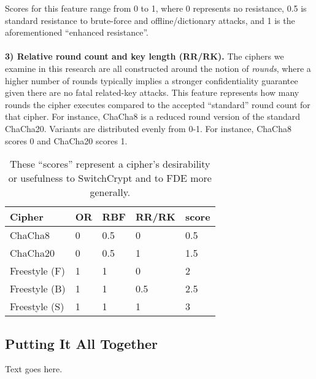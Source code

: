 Scores for this feature range from 0 to 1, where 0 represents no resistance, 0.5
is standard resistance to brute-force and offline/dictionary attacks, and 1 is
the aforementioned ``enhanced resistance''.\\
\\
\textbf{3) Relative round count and key length (RR/RK).} The ciphers we examine
in this research are all constructed around the notion of \emph{rounds}, where a
higher number of rounds typically implies a stronger confidentiality guarantee
given there are no fatal related-key attacks. This feature represents how many
rounds the cipher executes compared to the accepted ``standard'' round count for
that cipher. For instance, ChaCha8 is a reduced round version of the standard
ChaCha20. Variants are distributed evenly from 0-1. For instance, ChaCha8 scores
0 and ChaCha20 scores 1\@.

\begin{table}[]
  \begin{tabular}{@{}lllll@{}}
  \toprule
  \textbf{Cipher} & \textbf{OR} & \textbf{RBF} & \textbf{RR/RK} & \textbf{score} \\ \midrule
  ChaCha8         & 0           & 0.5          & 0              & 0.5            \\
  ChaCha20        & 0           & 0.5          & 1              & 1.5            \\
  Freestyle (F)   & 1           & 1            & 0              & 2              \\
  Freestyle (B)   & 1           & 1            & 0.5            & 2.5            \\
  Freestyle (S)   & 1           & 1            & 1              & 3
  \end{tabular}
  \caption{These ``scores'' represent a cipher's desirability or usefulness to
  SwitchCrypt and to FDE more generally.}
  \label{tbl:security-quant}
\end{table}

\subsection{Putting It All Together} \label{subsec:summary}

Text goes here.
